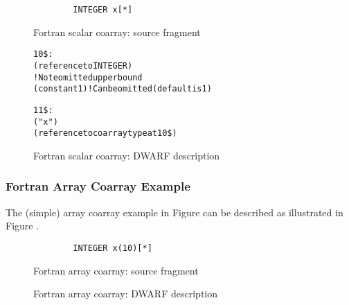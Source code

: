 \begin{figure}[!ht]
\begin{lstlisting}
        INTEGER x[*]
\end{lstlisting}
\caption{Fortran scalar coarray: source fragment}
\label{fig:Fortranscalarcoarraysourcefragment}
\end{figure}

\begin{figure}[!ht]
\begin{dwflisting}
\begin{alltt}
10\$:  \DWTAGcoarraytype
          \DWATtype(reference to INTEGER)
          \DWTAGsubrangetype                ! Note omitted upper bound
          \DWATlowerbound(constant 1)       ! Can be omitted (default is 1)

11\$:  \DWTAGvariable
          \DWATname("x")
          \DWATtype(reference to coarray type at 10\$)
\end{alltt}
\end{dwflisting}
\caption{Fortran scalar coarray: DWARF description}
\label{fig:FortranscalarcoarrayDWARFdescription}
\end{figure}

\subsubsection{Fortran Array Coarray Example}
The  (simple) array coarray example
in Figure  can be described as 
illustrated in Figure .

\begin{figure}[ht]
\begin{lstlisting}
        INTEGER x(10)[*]
\end{lstlisting}
\caption{Fortran array coarray: source fragment}
\label{fig:Fortranarraycoarraysourcefragment}
\end{figure}

\begin{figure}[ht]
\caption{Fortran array coarray: DWARF description}
\label{fig:FortranarraycoarrayDWARFdescription}
\end{figure}

